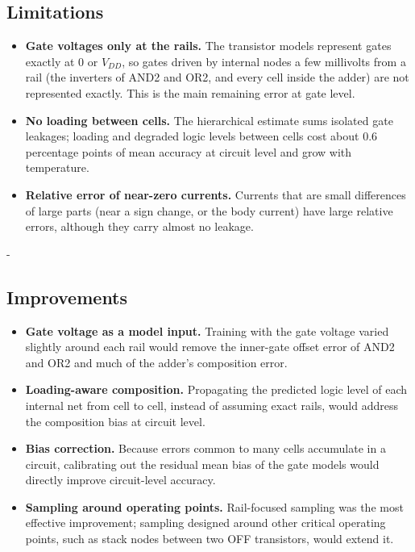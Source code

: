 \documentclass[12pt, a4paper]{article}
\makeatletter
\newcommand{\keepspace}[1]{\par\begingroup
  \setlength{\dimen@}{#1}%
  \dimen@ii\pagegoal \advance\dimen@ii-\pagetotal
  \ifdim\dimen@>\dimen@ii
    \ifdim\dimen@ii>\z@ \vfil\fi
    \break
  \fi\endgroup}
\makeatother
\begin{document}
\subsection{Limitations}
\begin{itemize}[leftmargin=*]
    \item \textbf{Gate voltages only at the rails.} The transistor models represent gates exactly at 0 or $V_{DD}$, so gates driven by internal nodes a few millivolts from a rail (the inverters of AND2 and OR2, and every cell inside the adder) are not represented exactly. This is the main remaining error at gate level.
    \item \textbf{No loading between cells.} The hierarchical estimate sums isolated gate leakages; loading and degraded logic levels between cells cost about 0.6 percentage points of mean accuracy at circuit level and grow with temperature.
    \item \textbf{Relative error of near-zero currents.} Currents that are small differences of large parts (near a sign change, or the body current) have large relative errors, although they carry almost no leakage.
\end{itemize}

\keepspace{14\baselineskip}
\subsection{Improvements}
\begin{itemize}[leftmargin=*]
    \item \textbf{Gate voltage as a model input.} Training with the gate voltage varied slightly around each rail would remove the inner-gate offset error of AND2 and OR2 and much of the adder's composition error.
    \item \textbf{Loading-aware composition.} Propagating the predicted logic level of each internal net from cell to cell, instead of assuming exact rails, would address the composition bias at circuit level.
    \item \textbf{Bias correction.} Because errors common to many cells accumulate in a circuit, calibrating out the residual mean bias of the gate models would directly improve circuit-level accuracy.
    \item \textbf{Sampling around operating points.} Rail-focused sampling was the most effective improvement; sampling designed around other critical operating points, such as stack nodes between two OFF transistors, would extend it.
\end{itemize}
\end{document}
